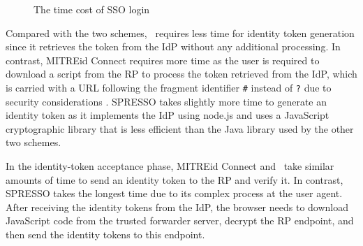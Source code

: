 \begin{figure}[tb]
  \centering
  \caption{The time cost of SSO login}
  \label{fig:evaluation}
\end{figure}

Compared with the two schemes, \usso\ requires less time for identity token generation since it retrieves the token from the IdP without any additional processing. In contrast,
MITREid Connect requires more time as the user is required to download a script from the RP to process the token retrieved from the IdP, which is carried with a URL following the fragment identifier \verb+#+ instead of \verb+?+ due to security considerations \cite{de2014oauth}. SPRESSO takes slightly more time to generate an identity token as it implements the IdP using node.js and uses a JavaScript cryptographic library that is less efficient than the Java library used by the other two schemes.

In the identity-token acceptance phase, MITREid Connect and \usso\ take similar amounts of time to send an identity token to the RP and verify it.
In contrast, SPRESSO takes the longest time due to its complex process at the user agent.
After receiving the identity tokens from the IdP, the browser needs to download JavaScript code from the trusted forwarder server, decrypt the RP endpoint, and then send the identity tokens to this endpoint.

